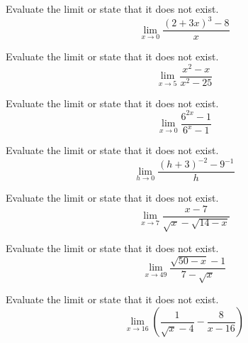 \documentclass[12pt,addpoints, answers, fleqn]{exam}
\begin{document}
\begin{teacher}
\begin{questions}
Evaluate the limit or state that it does not exist.
\[
\lim_{x \to 0} \frac{\left(2+3x\right)^3-8}{x }
\]


\begin{solution}
\end{solution}

\question 	%

Evaluate the limit or state that it does not exist.
\[
\lim_{x \to 5} \frac{x^2-x}{x^2-25 }
\]


\begin{solution}
\end{solution}

\question 	%

Evaluate the limit or state that it does not exist.
\[
\lim_{x \to 0} \frac{6^{2x}-1}{6^x-1}
\]


\begin{solution}
\end{solution}

\question 	%

Evaluate the limit or state that it does not exist.
\[
\lim_{h \to 0} \frac{\left(h+3\right)^{-2} - 9^{-1}}{h}
\]


\begin{solution}
\end{solution}

\question 	%

Evaluate the limit or state that it does not exist.
\[
\lim_{x \to 7} \frac{x-7}{\sqrt{x} -\sqrt{14-x} }
\]


\begin{solution}
\end{solution}

\question 	%

Evaluate the limit or state that it does not exist.
\[
\lim_{x \to 49} \frac{\sqrt{50-x} - 1}{7-\sqrt{x} }
\]


\begin{solution}
\end{solution}

\question 	%

Evaluate the limit or state that it does not exist.
\[
\lim_{x \to 16} \left( \frac{1}{\sqrt{x}-4} - \frac{8}{x-16} \right)
\]


\begin{solution}
\end{solution}


\end{questions}
\end{teacher}
\end{document}
